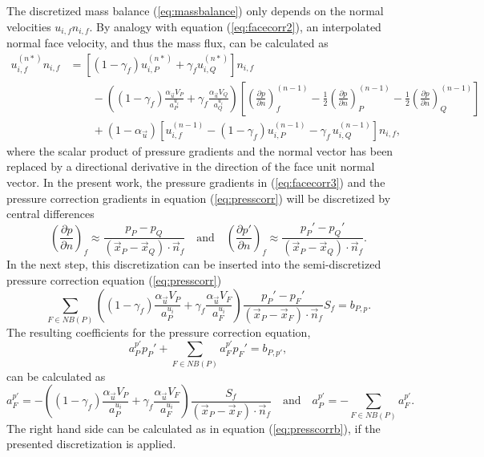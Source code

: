 The discretized mass balance (\ref{eq:massbalance}) only depends on the normal velocities \(u_{i,f} n_{i,f}\). By analogy with equation (\ref{eq:facecorr2}), an interpolated normal face velocity, and thus the mass flux, can be calculated as
\begin{align}
  \label{eq:facecorr3}
  u_{i,f}^{(n*)} n_{i,f}
  &=
  \left[\left(1 - \gamma_f\right) u_{i,P}^{(n*)} + \gamma_f u_{i,Q}^{(n*)} \right]n_{i,f} \nonumber\\[1em]
  &\quad\quad - 
  \left(\left(1 - \gamma_f\right) \frac{\alpha_\vec{u} V_P}{a_P^{u_i}} + \gamma_f \frac{\alpha_\vec{u} V_Q}{a_Q^{u_i}}\right)
  \left[ 
  \left(\frac{\partial p}{\partial n}\right)_f^{(n-1)} 
  -  \frac{1}{2} \left( \frac{\partial p}{\partial n} \right)_P^{(n-1)} 
  -  \frac{1}{2} \left(\frac{\partial p}{\partial n}\right)_Q^{(n-1)} 
\right] \nonumber \\[1em]
&\quad\quad + \left(1 - \alpha_\vec{u}\right) \left[ u_{i,f}^{(n-1)} - \left(1 - \gamma_f\right) u_{i,P}^{(n-1)} - \gamma_f \, u_{i,Q}^{(n-1)} \right] n_{i,f},
\end{align}
where the scalar product of pressure gradients and the normal vector has been replaced by a directional derivative in the direction of the face unit normal vector. In the present work, the pressure gradients in (\ref{eq:facecorr3}) and the pressure correction gradients in equation (\ref{eq:presscorr}) will be discretized by central differences
\begin{displaymath}
\left(\frac{\partial p}{\partial n}\right)_f \approx \frac{p_P - p_Q}{\left(\vec{x}_P - \vec{x}_Q\right)\cdot \vec{n}_f} 
\quad \text{and} \quad 
\left(\frac{\partial p'}{\partial n}\right)_f \approx \frac{p_P' - p_Q'}{\left(\vec{x}_P - \vec{x}_Q\right)\cdot \vec{n}_f}.
\end{displaymath}
In the next step, this discretization can be inserted into the semi-discretized pressure correction equation (\ref{eq:presscorr}) 
\begin{displaymath}
  \sum_{F \in NB(P)} \left(\left(1 - \gamma_f\right) \frac{\alpha_\vec{u} V_P}{a_P^{u_i}} + \gamma_f \frac{\alpha_\vec{u} V_F}{a_F^{u_i}}\right)
   \frac{p_P' - p_F'}{\left(\vec{x}_P - \vec{x}_F\right)\cdot \vec{n}_f} S_f
  = b_{P,p}.
\end{displaymath}
The resulting coefficients for the pressure correction equation,
\begin{displaymath}
  a_P^{p'} p_{P}' + \sum_{F \in NB(P)} a_F^{p'} p_{F}' = b_{P,p'},
\end{displaymath}
can be calculated as
\begin{equation}
  \label{eq:segpresscorrcoeff}
  a_F^{p'} = -\left(\left(1 - \gamma_f\right) \frac{\alpha_\vec{u} V_P}{a_P^{u_i}} + \gamma_f \frac{\alpha_\vec{u} V_F}{a_F^{u_i}}\right) \frac{S_f}{\left(\vec{x}_P - \vec{x}_F\right) \cdot \vec{n}_f} \quad \text{and} \quad
  a_P^{p'} = - \sum_{F \in NB(P)} a_F^{p'}.
\end{equation}
The right hand side can be calculated as in equation (\ref{eq:presscorrb}), if the presented discretization is applied. 

